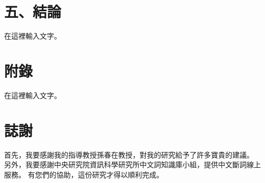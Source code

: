 \documentclass[letterpaper, 10pt, conference]{ieeeconf}   %
\begin{document}
\begin{CJK}{UTF8}{bsmi}
\section*{五、結論}

在這裡輸入文字。%

\addtolength{\textheight}{-12cm}  %


\section*{附錄}

在這裡輸入文字。%

\section*{誌謝}

首先，我要感謝我的指導教授孫春在教授，對我的研究給予了許多寶貴的建議。%
另外，我要感謝中央研究院資訊科學研究所中文詞知識庫小組，提供中文斷詞線上服務。%
有您們的協助，這份研究才得以順利完成。%





\end{CJK}
\end{document}
